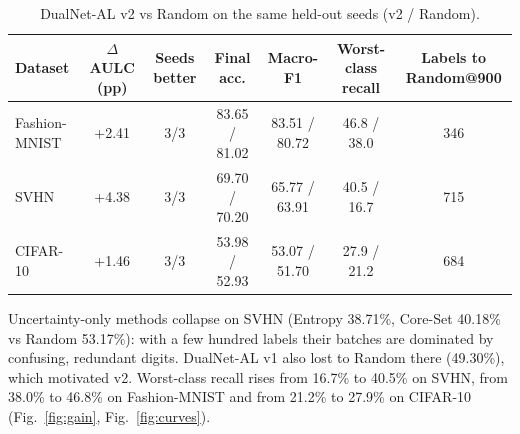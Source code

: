 \documentclass[conference,a4paper]{IEEEtran}
\begin{document}
\begin{table}[t]
\caption{Held-out AULC (\%), mean $\pm$ std over seeds 3, 4, 5. Best in bold.}
\label{tab:main}
\centering\footnotesize
{}
\end{table}

\begin{table}[t]
\caption{DualNet-AL v2 vs Random on the same held-out seeds (v2 / Random).}
\label{tab:pair}
\centering\small
\begin{tabular}{lcccccc}
\toprule
Dataset & $\Delta$AULC (pp) & Seeds better & Final acc. & Macro-F1 & Worst-class recall & Labels to Random@900 \\
\midrule
Fashion-MNIST & +2.41 & 3/3 & 83.65 / 81.02 & 83.51 / 80.72 & 46.8 / 38.0 & 346 \\
SVHN & +4.38 & 3/3 & 69.70 / 70.20 & 65.77 / 63.91 & 40.5 / 16.7 & 715 \\
CIFAR-10 & +1.46 & 3/3 & 53.98 / 52.93 & 53.07 / 51.70 & 27.9 / 21.2 & 684 \\
\bottomrule
\end{tabular}
\end{table}

Uncertainty-only methods collapse on SVHN (Entropy 38.71\%, Core-Set
40.18\% vs Random 53.17\%): with a few hundred labels their batches are dominated by
confusing, redundant digits. DualNet-AL v1 also lost to Random there (49.30\%), which
motivated v2. Worst-class recall rises from 16.7\% to 40.5\% on SVHN, from 38.0\% to 46.8\% on
Fashion-MNIST and from 21.2\% to 27.9\% on CIFAR-10 (Fig.~\ref{fig:gain}, Fig.~\ref{fig:curves}).
\end{document}
